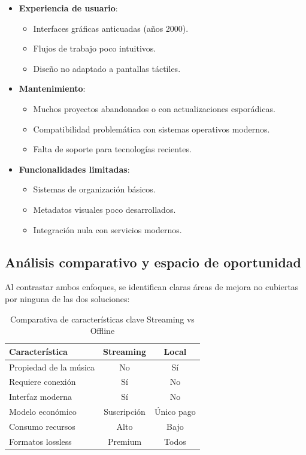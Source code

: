\documentclass[11pt, a4paper]{article}
\begin{document}
\begin{itemize}
    \item \textbf{Experiencia de usuario}:
    \begin{itemize}
        \item Interfaces gráficas anticuadas (años 2000).
        \item Flujos de trabajo poco intuitivos.
        \item Diseño no adaptado a pantallas táctiles.
    \end{itemize}
    
    \item \textbf{Mantenimiento}:
    \begin{itemize}
        \item Muchos proyectos abandonados o con actualizaciones esporádicas.
        \item Compatibilidad problemática con sistemas operativos modernos.
        \item Falta de soporte para tecnologías recientes.
    \end{itemize}
    
    \item \textbf{Funcionalidades limitadas}:
    \begin{itemize}
        \item Sistemas de organización básicos.
        \item Metadatos visuales poco desarrollados.
        \item Integración nula con servicios modernos.
    \end{itemize}
\end{itemize}

\subsection{Análisis comparativo y espacio de oportunidad}

Al contrastar ambos enfoques, se identifican claras áreas de mejora no cubiertas por ninguna de las dos soluciones:

\begin{table}[h]
  \centering
  \caption{Comparativa de características clave Streaming vs Offline}
  \begin{tabular}{|l|c|c|}
    \hline
    \textbf{Característica} & \textbf{Streaming} & \textbf{Local} \\
    \hline
    Propiedad de la música & No & Sí \\
    \hline
    Requiere conexión & Sí & No \\
    \hline
    Interfaz moderna & Sí & No \\
    \hline
    Modelo económico & Suscripción & Único pago \\
    \hline
    Consumo recursos & Alto & Bajo \\
    \hline
    Formatos lossless & Premium & Todos \\
    \hline
  \end{tabular}
\end{table}
\end{document}
